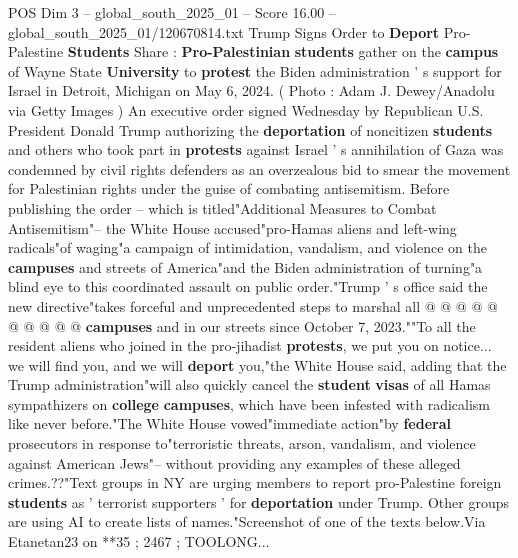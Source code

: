 \begin{textsample}{POS Dim 3 – global\_south\_2025\_01 – Score 16.00 – global\_south\_2025\_01/120670814.txt}  \label{ex:f3_pos_400}
Trump Signs Order to \textbf{Deport} Pro-Palestine \textbf{Students} Share : \textbf{Pro-Palestinian} \textbf{students} gather on the \textbf{campus} of Wayne State \textbf{University} to \textbf{protest} the Biden administration ' s support for Israel in Detroit, Michigan on May 6, 2024. ( Photo : Adam J.
Dewey/Anadolu via Getty Images ) An executive order signed Wednesday by Republican U.S.
President Donald Trump authorizing the \textbf{deportation} of noncitizen \textbf{students} and others who took part in \textbf{protests} against Israel ' s annihilation of Gaza was condemned by civil rights defenders as an overzealous bid to smear the movement for Palestinian rights under the guise of combating antisemitism.
Before publishing the order -- which is titled"Additional Measures to Combat Antisemitism"-- the White House accused"pro-Hamas aliens and left-wing radicals"of waging"a campaign of intimidation, vandalism, and violence on the \textbf{campuses} and streets of America"and the Biden administration of turning"a blind eye to this coordinated assault on public order."Trump ' s office said the new directive"takes forceful and unprecedented steps to marshal all @ @ @ @ @ @ @ @ @ @ \textbf{campuses} and in our streets since October 7, 2023.""To all the resident aliens who joined in the pro-jihadist \textbf{protests}, we put you on notice... we will find you, and we will \textbf{deport} you,"the White House said, adding that the Trump administration"will also quickly cancel the \textbf{student} \textbf{visas} of all Hamas sympathizers on \textbf{college} \textbf{campuses}, which have been infested with radicalism like never before."The White House vowed"immediate action"by \textbf{federal} prosecutors in response to"terroristic threats, arson, vandalism, and violence against American Jews"-- without providing any examples of these alleged crimes.??"Text groups in NY are urging members to report pro-Palestine foreign \textbf{students} as ' terrorist supporters ' for \textbf{deportation} under Trump.
Other groups are using AI to create lists of names."Screenshot of one of the texts below.Via Etanetan23 on **35 ; 2467 ; TOOLONG...

\end{textsample}
